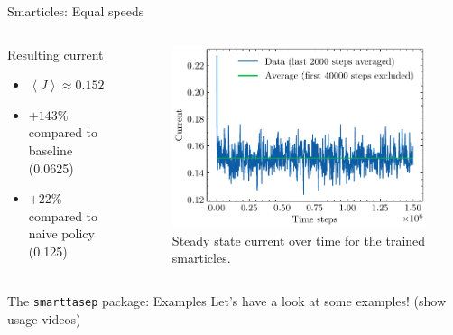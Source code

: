 \documentclass[10pt,xcolor=table, aspectratio=1610]{beamer}
\begin{document}
\begin{frame}{Smarticles: Equal speeds}
  \begin{columns}
    \begin{block}{Resulting current}
      \begin{itemize}
        \item $\left\langle J \right\rangle \approx 0.152$
        \item $+143\%$ compared to baseline (0.0625)
        \item $+22\%$ compared to naive policy (0.125)
      \end{itemize}
    \end{block}
    \begin{figure}
        \includegraphics[width=\textwidth]{../Thesis/img/results/equal_speeds.pdf}
        \caption*{Steady state current over time for the trained smarticles.}
      \end{figure}
  \end{columns}
\end{frame}

\begin{frame}{The \texttt{smarttasep} package: Examples}
  Let's have a look at some examples! (show usage videos)
\end{frame}
\end{document}

